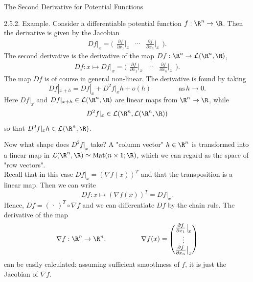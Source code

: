 \documentclass[smaller,hyperref={CJKbookmarks=true}]{beamer}
\begin{document}
\begin{frame}{The Second Derivative for Potential Functions}
\begin{spacing}{0.9}
\alert{2.5.2. Example.} Consider a dif{}ferentiable potential function $f:\R^n\to\R$. Then the derivative is given by the Jacobian
\[Df|_x=\Big(\begin{matrix}
          \frac{\partial f}{\partial x_1}\big|_x & \cdots & \frac{\partial f}{\partial x_n}\big|_x
        \end{matrix}\Big).\]
The second derivative is the derivative of the map $Df:\R^n\to\mathcal{L}(\R^n,\R)$,
\[Df:x\mapsto Df|_x=\Big(\begin{matrix}
          \frac{\partial f}{\partial x_1}\big|_x & \cdots & \frac{\partial f}{\partial x_n}\big|_x
        \end{matrix}\Big).\]
The map $Df$ is of course in general non-linear. The derivative is found by taking
\[Df|_{x+h}=Df|_x+D^2f|_xh+o(h)\qquad\qquad
\text{as}\,h\to0.\]
Here $Df|_x$ and $Df|_{x+h}\in\mathcal{L}(\R^n,\R)$ are linear maps from $\R^n\to\R$, while
\[D^2f|_x\in\mathcal{L}(\R^n,\mathcal{L}(\R^n,\R))\]
\vspace*{-4pt}
so that $D^2f|_xh\in\mathcal{L}(\R^n,\R)$.
\end{spacing}
\newpage
\begin{spacing}{0.95}
Now what shape does $D^2f|_x$ take? A "column vector" $h\in\R^n$ is transformed into a linear map in $\mathcal{L}(\R^n,\R)\simeq\text{Mat}(n\times
1;\R)$, which we can regard as the space of "row vectors".\\[5pt]
Recall that in this case $Df|_x=(\nabla f(x))^T$ and that the transposition is a linear map. Then we can write
\[Df:x\mapsto(\nabla f(x))^T=Df|_x.\]
Hence, $Df=(\,\cdot\,)^T\circ\nabla f$ and we can dif{}ferentiate $Df$ by the chain rule. The derivative of the map
\[\nabla f:\R^n\to\R^n,\qquad\qquad\quad
\nabla f(x)=\begin{pmatrix}
              \frac{\partial f}{\partial x_1}\big|_x \\
              \vdots \\
              \frac{\partial f}{\partial x_n}\big|_x
            \end{pmatrix}\]
\vspace*{-1pt}
can be easily calculated: assuming suf{}ficient smoothness of $f$, it is just the Jacobian of $\nabla f$.
\end{spacing}
\end{frame}
\end{document}
